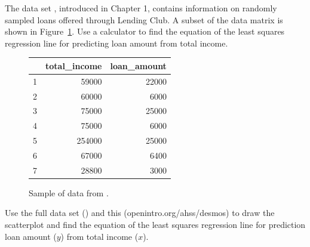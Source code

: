 \begin{exercisewrap}
\begin{nexercise}\label{subsetOfLoan50}%
The data set , introduced in Chapter 1, contains information on randomly sampled loans offered through Lending Club.  A subset of the data matrix is shown in
Figure~\ref{data_for_regr_calc_exercise_loan50}.  Use a calculator to find the equation of the least squares regression line for predicting loan amount from total income.\footnotemark 
\end{nexercise}
\end{exercisewrap}

\begin{figure}[ht]
\centering
\begin{tabular}{rrr}
  \hline
 & total\_income & loan\_amount \\ 
  \hline
1 & 59000 & 22000 \\ 
  2 & 60000 & 6000 \\ 
  3 & 75000 & 25000 \\ 
  4 & 75000 & 6000 \\ 
  5 & 254000 & 25000 \\ 
  6 & 67000 & 6400 \\ 
  7 & 28800 & 3000 \\ 
   \hline
\end{tabular}
\caption{Sample of data from .}
\label{data_for_regr_calc_exercise_loan50}
\end{figure}


\D{\newpage}

\begin{examplewrap}
\begin{nexample}
{Use the full  data set () and this  \mbox{(\small{openintro.org/ahss/desmos})} to draw the scatterplot and find the equation of the least squares regression line for prediction loan amount ($y$) from total income ($x$).}
\begin{center}
\end{center}
\end{nexample}
\end{examplewrap}
\label{loan50Desmos}
\D{\newpage}

